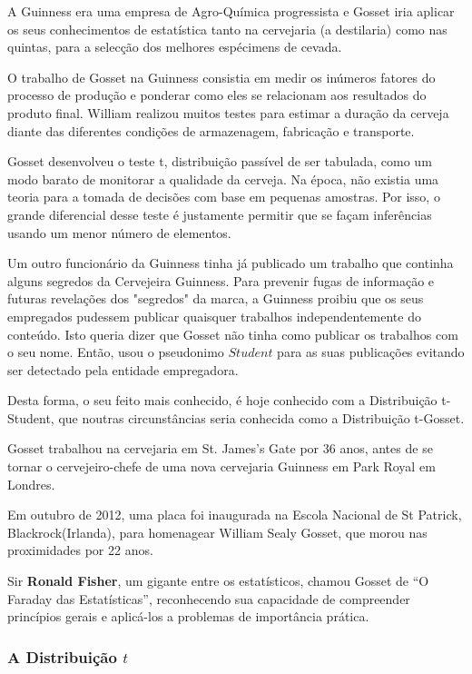 A Guinness era uma empresa de Agro-Química progressista e Gosset iria aplicar os seus conhecimentos de estatística tanto na cervejaria (a destilaria) como nas quintas, para a selecção dos melhores espécimens de cevada.\vskip0.3cm

O trabalho de Gosset na Guinness consistia em medir os inúmeros fatores do processo de produção e ponderar como eles se relacionam aos resultados do produto final. William realizou muitos testes para estimar a duração da cerveja diante das diferentes condições de armazenagem, fabricação e transporte.\vskip0.3cm


Gosset desenvolveu o teste t, distribuição passível de ser tabulada, como um modo barato de monitorar a qualidade da cerveja. Na época, não existia uma teoria para a tomada de decisões com base em pequenas amostras. Por isso, o grande diferencial desse teste é justamente permitir que se façam inferências usando um menor número de elementos. \vskip0.3cm

Um outro funcionário da Guinness tinha já publicado um trabalho que continha alguns segredos da Cervejeira Guinness. Para prevenir fugas de informação e futuras revelações dos "segredos" da marca, a Guinness proibiu que os seus empregados pudessem publicar quaisquer trabalhos independentemente do conteúdo. Isto queria dizer que Gosset não tinha como publicar os trabalhos com o seu nome. Então, usou o pseudonimo $Student$ para as suas publicações evitando ser detectado pela entidade empregadora. \vskip0.3cm

Desta forma, o seu feito mais conhecido, é hoje conhecido com a Distribuição t-Student, que noutras circunstâncias seria conhecida como a Distribuição t-Gosset.\vskip0.3cm


Gosset trabalhou na cervejaria em St. James's Gate por 36 anos, antes de se tornar o cervejeiro-chefe de uma nova cervejaria Guinness em Park Royal em Londres.\vskip0.3cm

Em outubro de 2012, uma placa foi inaugurada na Escola Nacional de St Patrick, Blackrock(Irlanda), para homenagear William Sealy Gosset, que morou nas proximidades por 22 anos. \vskip0.3cm

Sir \textbf{Ronald Fisher}, um gigante entre os estatísticos, chamou Gosset de “O Faraday das Estatísticas”, reconhecendo sua capacidade de compreender princípios gerais e aplicá-los a problemas de importância prática.



\subsubsection{A Distribuição $t$ }

